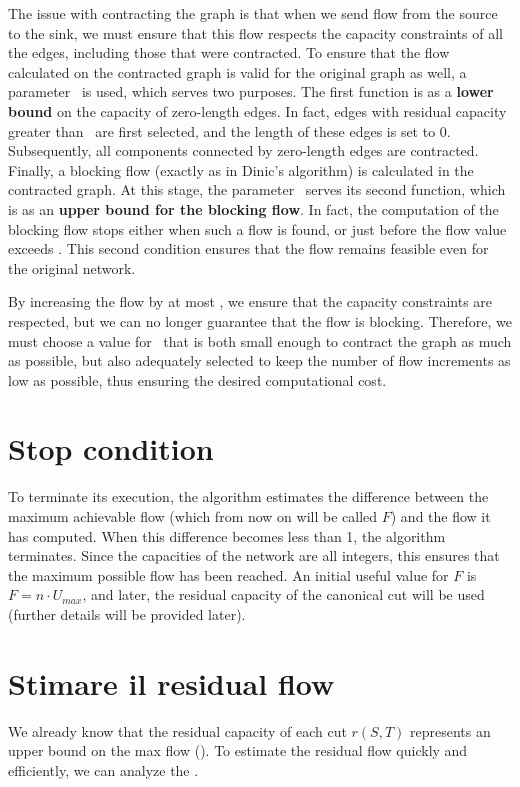     The issue with contracting the graph is that when we send flow from the source to the sink, we must ensure that this flow respects the capacity constraints of all the edges, including those that were contracted.  
    To ensure that the flow calculated on the contracted graph is valid for the original graph as well, a parameter \dlt\ is used, which serves two purposes. The first function is as a \textbf{lower bound} on the capacity of zero-length edges.  
    In fact, edges with residual capacity greater than \dlt\ are first selected, and the length of these edges is set to 0.  
    Subsequently, all components connected by zero-length edges are contracted.  
    Finally, a blocking flow (exactly as in Dinic's algorithm) is calculated in the contracted graph.  
    At this stage, the parameter \dlt\ serves its second function, which is as an \textbf{upper bound for the blocking flow}. In fact, the computation of the blocking flow stops either when such a flow is found, or just before the flow value exceeds \dlt. This second condition ensures that the flow remains feasible even for the original network.

    By increasing the flow by at most \dlt, we ensure that the capacity constraints are respected, but we can no longer guarantee that the flow is blocking.  
    Therefore, we must choose a value for \dlt\ that is both small enough to contract the graph as much as possible, but also adequately selected to keep the number of flow increments as low as possible, thus ensuring the desired computational cost.

\section{Stop condition}
    To terminate its execution, the algorithm estimates the difference between the maximum achievable flow (which from now on will be called $F$) and the flow it has computed.
    When this difference becomes less than 1, the algorithm terminates.
    Since the capacities of the network are all integers, this ensures that the maximum possible flow has been reached.
    An initial useful value for $F$ is $F=n\cdot U_{max}$, and later, the residual capacity of the canonical cut will be used (further details will be provided later).


\section{Stimare il residual flow}
    We already know that the residual capacity of each cut $r(S,T)$ represents an upper bound on the max flow ().
    To estimate the residual flow quickly and efficiently, we can analyze the .

